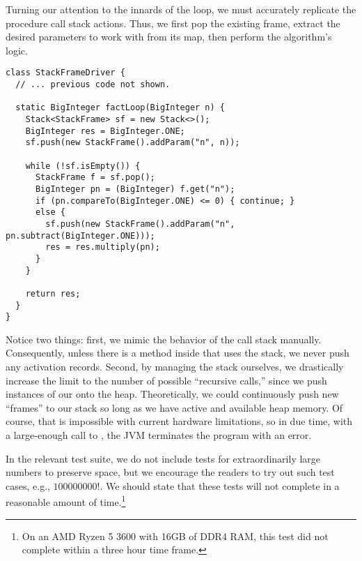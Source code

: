 Turning our attention to the innards of the loop, we must accurately replicate the procedure call stack actions. 
Thus, we first pop the existing frame, extract the desired parameters to work with from its map, then perform the algorithm's logic.

\begin{lstlisting}[language=MyJava]
class StackFrameDriver {
  // ... previous code not shown.

  static BigInteger factLoop(BigInteger n) {
    Stack<StackFrame> sf = new Stack<>();
    BigInteger res = BigInteger.ONE;
    sf.push(new StackFrame().addParam("n", n));

    while (!sf.isEmpty()) {
      StackFrame f = sf.pop();
      BigInteger pn = (BigInteger) f.get("n");
      if (pn.compareTo(BigInteger.ONE) <= 0) { continue; }
      else {
        sf.push(new StackFrame().addParam("n", pn.subtract(BigInteger.ONE)));
        res = res.multiply(pn);
      }
    }

    return res;
  }
}
\end{lstlisting}

Notice two things: first, we mimic the behavior of the call stack manually. 
Consequently, unless there is a method inside that uses the stack, we never push any activation records. 
Second, by managing the stack ourselves, we drastically increase the limit to the number of possible ``recursive calls,'' since we push instances of our  onto the heap. 
Theoretically, we could continuously push new ``frames'' to our stack so long as we have active and available heap memory. 
Of course, that is impossible with current hardware limitations, so in due time, with a large-enough call to , the JVM terminates the program with an  error. 

In the relevant test suite, we do not include tests for extraordinarily large numbers to preserve space, but we encourage the readers to try out such test cases, e.g., $100000000!$. 
We should state that these tests will not complete in a reasonable amount of time.\footnote{On an AMD Ryzen 5 3600 with 16GB of DDR4 RAM, this test did not complete within a three hour time frame.} 